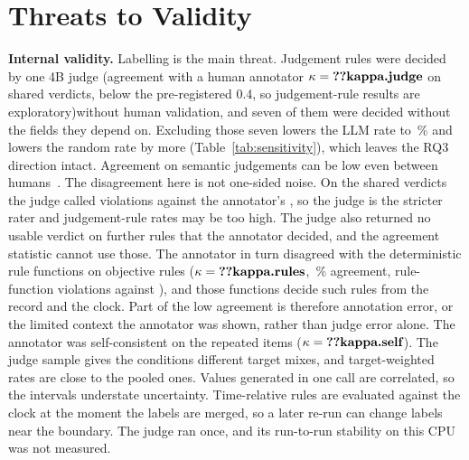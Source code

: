 \documentclass[conference]{IEEEtran}
\begin{document}
\section{Threats to Validity}
\label{sec:threats}

\textbf{Internal validity.} Labelling is the main threat. Judgement rules were decided by one 4B judge
\ifhumanlabels (agreement with a human annotator $\kappa=\R{kappa.judge}$ on  shared
verdicts, below the pre-registered 0.4, so judgement-rule results are exploratory)\else without human
validation\fi, and seven of them were decided without the fields they depend on. Excluding those seven
lowers the LLM rate to \,\% and lowers the random rate by more
(Table~\ref{tab:sensitivity}), which leaves the RQ3 direction intact. Agreement on semantic judgements
can be low even between humans~\cite{calo2026semanticgap}.\ifhumanlabels{} The disagreement here is not
one-sided noise. On the shared verdicts the judge called  violations against the
annotator's , so the judge is the stricter rater and judgement-rule rates may be
too high. The judge also returned no usable verdict on  further rules that the
annotator decided, and the agreement statistic cannot use those. The annotator in turn disagreed with
the deterministic rule functions on objective rules ($\kappa=\R{kappa.rules}$, \,\%
agreement,  rule-function violations against ), and those
functions decide such rules from the record and the clock. Part of the low agreement is therefore
annotation error, or the limited context the annotator was shown, rather than judge error alone. The
annotator was self-consistent on the repeated items ($\kappa=\R{kappa.self}$).\fi{} The judge sample
gives the conditions different target mixes, and target-weighted rates are close to the pooled ones.
Values generated in one call are correlated, so the intervals understate uncertainty. Time-relative
rules are evaluated against the clock at the moment the labels are merged, so a later re-run can change
labels near the boundary. The judge ran once, and its run-to-run stability on this CPU was not
measured.
\end{document}

